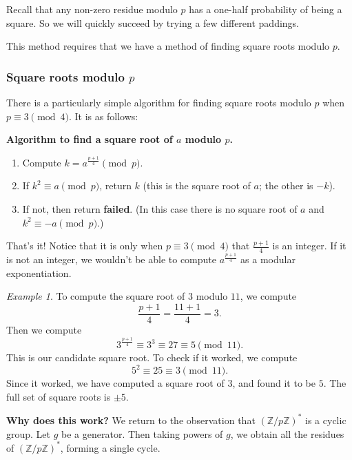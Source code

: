 \documentclass{article}
\theoremstyle{plain}
\theoremstyle{definition}
\theoremstyle{remark}
\newtheorem{example}[theorem]{Example}
\numberwithin{theorem}{section}
\newcommand{\ZZ}{\mathbb{Z}}
\begin{document}
Recall that any non-zero residue modulo $p$ has a one-half probability of being a square.  So we will quickly succeed by trying a few different paddings.

This method requires that we have a method of finding square roots modulo $p$.

\subsubsection{Square roots modulo $p$}



There is a particularly simple algorithm for finding square roots modulo $p$ when $p \equiv 3 \pmod{4}$.  It is as follows:

\textbf{Algorithm to find a square root of $a$ modulo $p$.}
\begin{enumerate}
    \item Compute $k = a^{\frac{p+1}{4}} \pmod{p}$.
    \item If $k^2 \equiv a \pmod{p}$, return $k$ (this is the square root of $a$; the other is $-k$).
    \item If not, then return \textbf{failed}. (In this case there is no square root of $a$ and $k^2 \equiv -a \pmod{p}$.)
\end{enumerate}

That's it!  Notice that it is only when $p \equiv 3 \pmod{4}$ that $\frac{p+1}{4}$ is an integer.  If it is not an integer, we wouldn't be able to compute $a^{\frac{p+1}{4}}$ as a modular exponentiation.

\begin{example}
    To compute the square root of $3$ modulo $11$, we compute
    \[
    \frac{p+1}{4} = \frac{11+1}{4} = 3.
    \]
    Then we compute
    \[
    3^{\frac{p+1}{4}} \equiv 3^3 \equiv 27 \equiv 5 \pmod{11}.
    \]
    This is our candidate square root.  To check if it worked, we compute
    \[
    5^2 \equiv 25 \equiv 3 \pmod{11}.
    \]
    Since it worked, we have computed a square root of $3$, and found it to be $5$.  The full set of square roots is $\pm 5$.
\end{example}

\textbf{Why does this work?}  We return to the observation that $(\ZZ/p\ZZ)^*$ is a cyclic group.  Let $g$ be a generator.  Then taking powers of $g$, we obtain all the residues of $(\ZZ/p\ZZ)^*$, forming a single cycle. 
\end{document}
